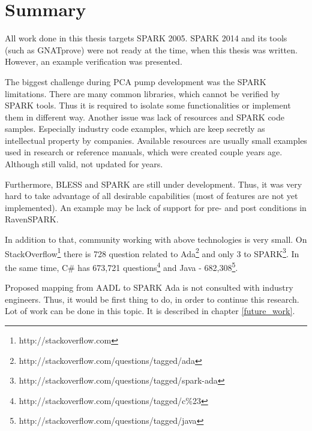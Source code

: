 
\cleardoublepage

\chapter{Summary}
\label{summary}

All work done in this thesis targets SPARK 2005. SPARK 2014 and its tools (such as GNATprove) were not ready at the time, when this thesis was written. However, an example verification was presented.

The biggest challenge during PCA pump development was the SPARK limitations. There are many common libraries, which cannot be verified by SPARK tools. Thus it is required to isolate some functionalities or implement them in different way. Another issue was lack of resources and SPARK code samples. Especially industry code examples, which are keep secretly as intellectual property by companies. Available resources are usually small examples used in research or reference manuals, which were created couple years age. Although still valid, not updated for years.

Furthermore, BLESS and SPARK are still under development. Thus, it was very hard to take advantage of all desirable capabilities (most of features are not yet implemented). An example may be lack of support for pre- and post conditions in RavenSPARK.

In addition to that, community working with above technologies is very small. On StackOverflow\footnote{http://stackoverflow.com} there is 728 question related to Ada\footnote{http://stackoverflow.com/questions/tagged/ada} and only 3 to SPARK\footnote{http://stackoverflow.com/questions/tagged/spark-ada}. In the same time, C\# has 673,721 questions\footnote{http://stackoverflow.com/questions/tagged/c\%23} and Java - 682,308\footnote{http://stackoverflow.com/questions/tagged/java}.

Proposed mapping from AADL to SPARK Ada is not consulted with industry engineers. Thus, it would be first thing to do, in order to continue this research. Lot of work can be done in this topic. It is described in chapter \ref{future_work}.